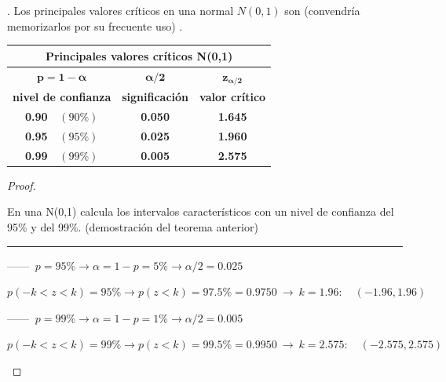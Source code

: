 \vspace{4mm} %
\begin{theorem}
. Los principales valores críticos en una normal $N(0,1)$ son \textcolor{gris}{(convendría memorizarlos por su frecuente uso)}	.

\begin{table}[H]
\centering
\begin{tabular}{|c|c|c|}
\hline
\multicolumn{3}{|c|}{\textbf{Principales valores críticos N(0,1)}} \\ \hline
\textbf{$\boldsymbol{p=1-\alpha}$} & \textbf{$\boldsymbol{\alpha/2}$} & \textbf{$\boldsymbol{z_{\alpha/2}}$} \\
\textbf{nivel de confianza} & \textbf{significación} & \textbf{valor crítico} \\ \hline
\textbf{0.90 $\  \  \  (90\%)$} & \textbf{0.050} & \textbf{1.645} \\
\textbf{0.95 $\  \  \  (95\%)$} & \textbf{0.025} & \textbf{1.960} \\
\textbf{0.99 $\  \  \  (99\%)$} & \textbf{0.005} & \textbf{2.575} \\ \hline
\end{tabular}
\end{table}
\end{theorem}

\vspace{4mm} %
\begin{proof}
	
\begin{ejemplo}
\begin{ejre}
En una N(0,1) calcula los intervalos característicos con un nivel de confianza del 95\% y del 99\%. \textcolor{gris}{(demostración del teorema anterior)}
	
\rule{150pt}{0.1pt}

------ $\ p=95\% \to \alpha=1-p=5\% \to \alpha/2=0.025$

$p(-k<z<k)=95\% \to p(z<k)=97.5\%=0.9750 \ \to \ k=1.96:\quad (-1.96,1.96)$

------ $\ p=99\% \to \alpha=1-p=1\% \to \alpha/2=0.005$

$p(-k<z<k)=99\% \to p(z<k)=99.5\%=0.9950 \ \to \ k=2.575:\quad (-2.575,2.575)$

\end{ejre}	
\end{ejemplo}

\end{proof}   

